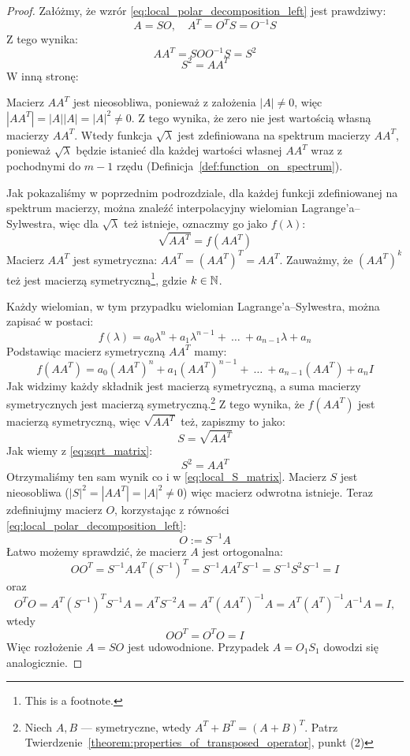 \begin{proof}
    Załóżmy, że wzrór \eqref{eq:local_polar_decomposition_left} jest prawdziwy:
    $$A = SO, \quad A^T = O^TS = O^{-1}S$$
    Z tego wynika:
    $$ AA^T = SOO^{-1}S = S^2 $$
    \begin{equation}\label{eq:local_S_matrix}
        S^2 = AA^T
    \end{equation}
    W inną stronę:

    Macierz $AA^T$ jest nieosobliwa, ponieważ z założenia $|A| \ne 0$, więc $|AA^T| = |A||A| = |A|^2 \ne 0$. Z tego wynika, że zero nie jest wartością własną macierzy $AA^T$. Wtedy funkcja $\sqrt{\lambda}$ jest zdefiniowana na spektrum macierzy $AA^T$, ponieważ $\sqrt{\lambda}$ będzie istanieć dla każdej wartości własnej $AA^T$ wraz z pochodnymi do $m - 1$ rzędu (Definicja~\ref{def:function_on_spectrum}). 
    
    Jak pokazaliśmy w poprzednim podrozdziale, dla każdej funkcji zdefiniowanej na spektrum macierzy, można znaleźć interpolacyjny wielomian Lagrange'a--Sylwestra, więc dla $\sqrt{\lambda}$ też istnieje, oznaczmy go jako $f(\lambda)$:
    $$
        \sqrt{AA^T} = f(AA^T)
    $$
    Macierz $AA^T$ jest symetryczna: $AA^T = (AA^T)^T = AA^T$.
    Zauważmy, że $(AA^T)^k$ też jest macierzą symetryczną\footnote{This is a footnote.}, gdzie $k \in \mathbb{N}$.

    Każdy wielomian, w tym przypadku wielomian Lagrange'a--Sylwestra, można zapisać w postaci:
    $$ f(\lambda) = a_0\lambda^n + a_1\lambda^{n - 1} + \ \ldots \ + a_{n - 1}\lambda + a_{n} $$
    Podstawiąc macierz symetryczną $AA^T$ mamy:
    \begin{equation}\label{eq:function_AA}
        f(AA^T) = a_0(AA^T)^n + a_1(AA^T)^{n - 1} + \ \ldots  \ + a_{n - 1}(AA^T) + a_{n}I 
    \end{equation}
    Jak widzimy każdy składnik jest macierzą symetryczną, a suma macierzy symetrycznych jest macierzą symetryczną.\footnote{Niech $A, B$ --- symetryczne, wtedy $A^T + B^T = (A + B)^T$. Patrz Twierdzenie~\ref{theorem:properties_of_transposed_operator}, punkt (2)}
    Z tego wynika, że $f(AA^T)$ jest macierzą symetryczną,  więc $\sqrt{AA^T}$ też, zapiszmy to jako:
    $$S = \sqrt{AA^T}$$
    Jak wiemy z \eqref{eq:sqrt_matrix}:
    $$S^2 = AA^T$$
    Otrzymaliśmy ten sam wynik co i w \eqref{eq:local_S_matrix}. Macierz $S$ jest nieosobliwa ($|S|^2 = |AA^T| = |A|^2 \ne 0$) więc macierz odwrotna istnieje.
    Teraz zdefiniujmy macierz $O$, korzystając z równości \eqref{eq:local_polar_decomposition_left}:
    $$O := S^{-1}A$$
    Łatwo możemy sprawdzić, że macierz $A$ jest ortogonalna:
    $$ OO^T = S^{-1}AA^T(S^{-1})^T = S^{-1}AA^TS^{-1} = S^{-1}S^2S^{-1} = I $$
    oraz 
    $$O^TO = A^T(S^{-1})^TS^{-1}A = A^TS^{-2}A = A^T(AA^T)^{-1}A = A^T(A^T)^{-1}A^{-1}A = I,$$
    wtedy
    $$OO^T = O^TO = I$$
    Więc rozłożenie $A = SO$ jest udowodnione. Przypadek $A = O_1S_1$ dowodzi się analogicznie.


\end{proof}
